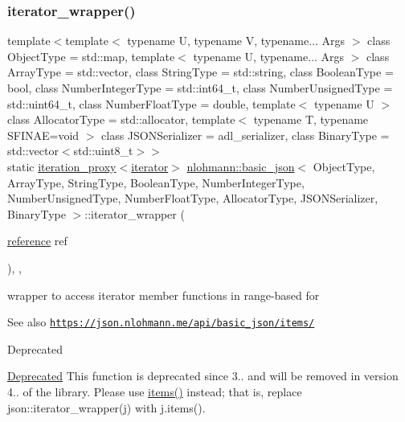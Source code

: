 \subsubsection{\texorpdfstring{iterator\+\_\+wrapper()}{iterator\_wrapper()}\hspace{0.1cm}{\footnotesize\ttfamily [1/2]}}
{\footnotesize\ttfamily template$<$template$<$ typename U, typename V, typename... Args $>$ class Object\+Type = std\+::map, template$<$ typename U, typename... Args $>$ class Array\+Type = std\+::vector, class String\+Type  = std\+::string, class Boolean\+Type  = bool, class Number\+Integer\+Type  = std\+::int64\+\_\+t, class Number\+Unsigned\+Type  = std\+::uint64\+\_\+t, class Number\+Float\+Type  = double, template$<$ typename U $>$ class Allocator\+Type = std\+::allocator, template$<$ typename T, typename S\+F\+I\+N\+A\+E=void $>$ class J\+S\+O\+N\+Serializer = adl\+\_\+serializer, class Binary\+Type  = std\+::vector$<$std\+::uint8\+\_\+t$>$$>$ \\
static \hyperlink{classnlohmann_1_1detail_1_1iteration__proxy}{iteration\+\_\+proxy}$<$\hyperlink{classnlohmann_1_1basic__json_aa549b2b382916b3baafb526e5cb410bd}{iterator}$>$ \hyperlink{classnlohmann_1_1basic__json}{nlohmann\+::basic\+\_\+json}$<$ Object\+Type, Array\+Type, String\+Type, Boolean\+Type, Number\+Integer\+Type, Number\+Unsigned\+Type, Number\+Float\+Type, Allocator\+Type, J\+S\+O\+N\+Serializer, Binary\+Type $>$\+::iterator\+\_\+wrapper (\begin{DoxyParamCaption}\item[{\hyperlink{classnlohmann_1_1basic__json_a220ae98554a76205fb7f8822d36b2d5a}{reference}}]{ref }\end{DoxyParamCaption})\hspace{0.3cm}{\ttfamily [inline]}, {\ttfamily [static]}, {\ttfamily [noexcept]}}



wrapper to access iterator member functions in range-\/based for 

\begin{DoxySeeAlso}{See also}
\href{https://json.nlohmann.me/api/basic_json/items/}{\tt https\+://json.\+nlohmann.\+me/api/basic\+\_\+json/items/} 
\end{DoxySeeAlso}
\begin{DoxyRefDesc}{Deprecated}
\item[\hyperlink{deprecated__deprecated000001}{Deprecated}]This function is deprecated since 3.. and will be removed in version 4.. of the library. Please use \hyperlink{classnlohmann_1_1basic__json_a916a6ba75ec7624e9c6c977a52d6fd17}{items()} instead; that is, replace {\ttfamily json\+::iterator\+\_\+wrapper(j)} with {\ttfamily j.\+items()}. \end{DoxyRefDesc}
\mbox{\label{classnlohmann_1_1basic__json_a3710ff8c5a1cbedb4f75b700a8962d5c}} 
